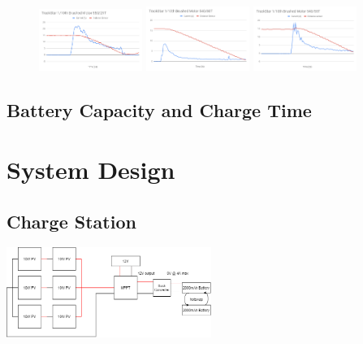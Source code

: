 \documentclass[11pt]{article}
\begin{document}
\begin{figure}[h!]
    \begin{center}
        \includegraphics[width=0.3\textwidth]{inc/large_motor.png}
        \includegraphics[width=0.3\textwidth]{inc/slow_motor.png}
        \includegraphics[width=0.3\textwidth]{inc/small_motor.png}
    \end{center}
\end{figure}

\subsection{Battery Capacity and Charge Time}

\section{System Design}
\subsection{Charge Station}

\begin{center}
    \includegraphics[width=0.5\textwidth]{inc/panels.png}
\end{center}
\end{document}

